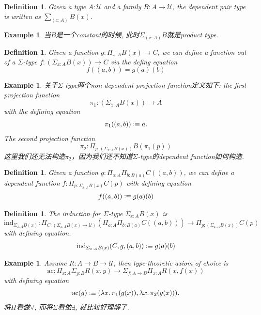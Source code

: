 \documentclass{article}
\newtheorem{example}[theorem]{Example}
\newtheorem{definition}[theorem]{Definition}
\newcommand{\lam}[2]{\ensuremath{\lambda #1\ldotp #2}} %
\newcommand{\defeqv}{\vcentcolon\equiv}
\begin{document}
\begin{definition}
\rm Given a type $A:\mathcal{U}$ and a family $B: A \to \mathcal{U}$, the dependent pair type is written as $\sum_{(x:A)} B(x)$.
\end{definition}

\begin{example}
\rm 当$B$是一个constant的时候, 此时$\Sigma_{(x:A)} B$就是product type.
\end{example}

\begin{definition}
\rm Given a function $g:\Pi_{x:A} B(x) \to C$, we can define a function out of a $\Sigma$-type $f:(\Sigma_{x:A}B(x)) \to C$ via the defing equation
\[
    f((a,b)) = g(a)(b)
\]
\end{definition}

\begin{example}
\rm 关于$\Sigma$-type两个non-dependent projection function定义如下: the first projection function
\[
    \pi_1:(\Sigma_{x:A}B(x)) \to A
\]
with the defining equation
\[
    \pi_1((a,b)) \defeqv a.
\]
The second projection function
\[
    \pi_2:\Pi_{p:(\Sigma_{x:A}B(x))} B(\pi_1(p)) 
\]
这里我们还无法构造$\pi_2$，因为我们还不知道$\Sigma$-type的dependent function如何构造.
\end{example}

\begin{definition}
\rm Given a function $g:\Pi_{a:A}\Pi_{b:B(a)} C((a,b))$, we can define a dependent function $f: \Pi_{p:\Sigma_{x:A} B(x)} C(p)$ with defining equation
\[
    f((a,b)) \defeqv g(a)(b)
\]
\end{definition}

\begin{definition}
\rm The induction for $\Sigma$-type $\Sigma_{x:A}B(x)$ is 
\[ 
    \text{ind}_{\Sigma_{x:A}B(x)}: \Pi_{C:(\Sigma_{x:A}B(x) \to \mathcal{U})}(\Pi_{a:A}\Pi_{b:B(a)} C((a,b))) \to \Pi_{p:(\Sigma_{x:A}B(x))} C(p) 
\]
with defining equation.
\[
    \text{ind}_{\Sigma_{x:A}B(x)} (C, g, (a,b)) \defeqv g(a)(b)
\]
\end{definition}

\begin{example}
\rm Assume $R : A \to B \to \mathcal{U}$, then type-theoretic axiom of choice is
\[
    \text{ac}: \Pi_{x : A}\Sigma_{y : B} R(x,y) \to \Sigma_{f : A \to B} \Pi_{x: A} R(x, f(x))
\]
with defining equation
\[
    \text{ac} (g) \defeqv (\lam{x}{\pi_1(g(x))}, \lam{x}{\pi_2(g(x))}).    
\]
将$\Pi$看做$\forall$, 而将$\Sigma$看做$\exists$, 就比较好理解了.
\end{example}
\end{document}
